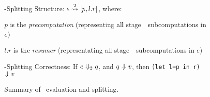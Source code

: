 \begin{figure}
\hspace{2em}\bbtwo-Splitting Structure: $e \overset{ 2}\rightsquigarrow [p,l.r]$, where:

\hspace{4em}$p$ is the \emph{precomputation} (representing all stage~\bbone\ subcomputations in $e$)

\hspace{4em}$l.r$ is the \emph{resumer} (representating all stage~\bbtwo\ subcomputations in $e$)

\hspace{2em}\bbtwo-Splitting Correctness: If $e~{\Downarrow_{ 2}}~q$, and $q~{\Downarrow}~v$, then \texttt{(let l=p in r)}~${\Downarrow}~v$

\caption{Summary of \lang\ evaluation and splitting.}
\label{fig:terminology}
\label{fig:termSplitSummary}
\end{figure}

